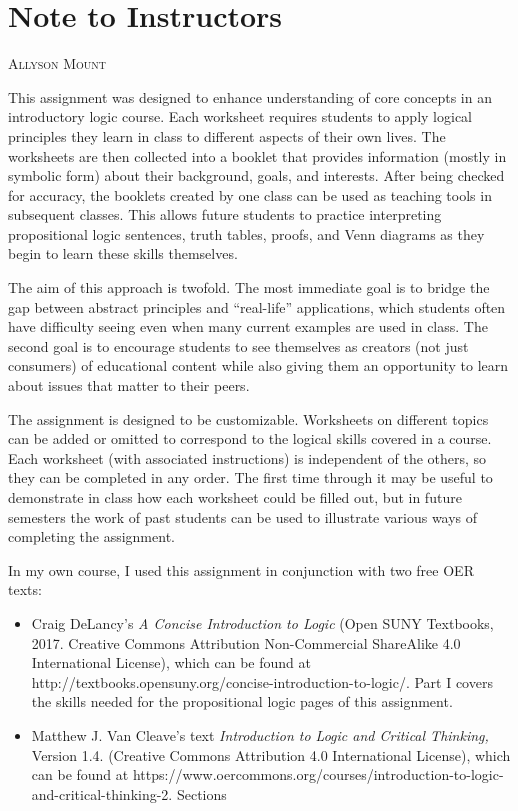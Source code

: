 \documentclass[oneside, openany]{book} %
\makeatletter
\newcommand\chapterauthor[1]{\authortoc{#1}\printchapterauthor{#1}}
\newcommand{\printchapterauthor}[1]{%
 {\parindent0pt\vspace*{-25pt}%
 \linespread{1.1}\large\scshape#1%
 \par\nobreak\vspace*{35pt}}
 \@afterheading%
}
\newcommand{\authortoc}[1]{%
 \addtocontents{toc}{\vskip-10pt}%
 \addtocontents{toc}{%
  \protect\contentsline{chapter}%
  {\hskip1.3em\mdseries\scshape\protect\scriptsize#1}{}{}}
 \addtocontents{toc}{\vskip5pt}%
}
\makeatother
\begin{document}
\pagebreak

\mainmatter

\chapter{Note to Instructors}

\chapterauthor{Allyson Mount}

This assignment was designed to enhance understanding of core concepts in an introductory logic course. Each worksheet requires students to apply logical principles they learn in class to different aspects of their own lives. The worksheets are then collected into a booklet that provides information (mostly in symbolic form) about their background, goals, and interests. After being checked for accuracy, the booklets created by one class can be used as teaching tools in subsequent classes. This allows future students to practice interpreting propositional logic sentences, truth tables, proofs, and Venn diagrams as they begin to learn these skills themselves.

The aim of this approach is twofold. The most immediate goal is to bridge the gap between abstract principles and ``real-life'' applications, which students often have difficulty seeing even when many current examples are used in class. The second goal is to encourage students to see themselves as creators (not just consumers) of educational content while also giving them an opportunity to learn about issues that matter to their peers.

The assignment is designed to be customizable. Worksheets on different topics can be added or omitted to correspond to the logical skills covered in a course. Each worksheet (with associated instructions) is independent of the others, so they can be completed in any order. The first time through it may be useful to demonstrate in class how each worksheet could be filled out, but in future semesters the work of past students can be used to illustrate various ways of completing the assignment.

In my own course, I used this assignment in conjunction with two free OER texts:

\begin{itemize}

\item Craig DeLancy's \textit{A Concise Introduction to Logic }(Open SUNY Textbooks, 2017. Creative Commons Attribution Non-Commercial ShareAlike 4.0 International License), which can be found at http://textbooks.opensuny.org/concise-introduction-to-logic/. Part I covers the skills needed for the propositional logic pages of this assignment.

\item Matthew J. Van Cleave's text \textit{Introduction to Logic and Critical Thinking, }Version 1.4. (Creative Commons Attribution 4.0 International License), which can be found at https://www.oercommons.org/courses/introduction-to-logic-and-critical-thinking-2. Sections

\end{itemize}
\end{document}

